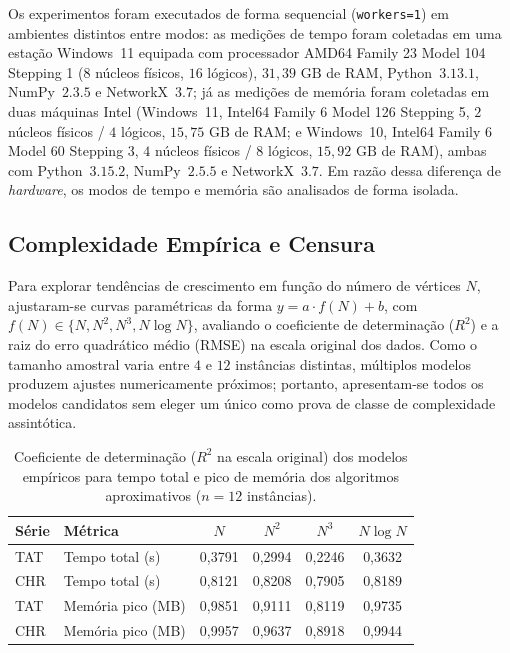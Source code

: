 \documentclass[12pt]{article}
\begin{document}
Os experimentos foram executados de forma sequencial (\texttt{workers=1}) em ambientes distintos entre modos: as medições de tempo foram coletadas em uma estação Windows~11 equipada com processador AMD64 Family 23 Model 104 Stepping 1 ($8$ núcleos físicos, $16$ lógicos), $31{,}39\text{ GB}$ de RAM, Python~$3.13.1$, NumPy~$2.3.5$ e NetworkX~$3.7$; já as medições de memória foram coletadas em duas máquinas Intel (Windows~11, Intel64 Family 6 Model 126 Stepping 5, $2$ núcleos físicos / $4$ lógicos, $15{,}75\text{ GB}$ de RAM; e Windows~10, Intel64 Family 6 Model 60 Stepping 3, $4$ núcleos físicos / $8$ lógicos, $15{,}92\text{ GB}$ de RAM), ambas com Python~$3.15.2$, NumPy~$2.5.5$ e NetworkX~$3.7$. Em razão dessa diferença de \textit{hardware}, os modos de tempo e memória são analisados de forma isolada.


\subsection{Complexidade Empírica e Censura}

Para explorar tendências de crescimento em função do número de vértices $N$, ajustaram-se curvas paramétricas da forma $y = a \cdot f(N) + b$, com $f(N) \in \{N, N^2, N^3, N \log N\}$, avaliando o coeficiente de determinação ($R^2$) e a raiz do erro quadrático médio (RMSE) na escala original dos dados. Como o tamanho amostral varia entre $4$ e $12$ instâncias distintas, múltiplos modelos produzem ajustes numericamente próximos; portanto, apresentam-se todos os modelos candidatos sem eleger um único como prova de classe de complexidade assintótica.

\begin{table}[ht]
\centering
\caption{Coeficiente de determinação ($R^2$ na escala original) dos modelos empíricos para tempo total e pico de memória dos algoritmos aproximativos ($n = 12$ instâncias).}
\label{tab:regressao_aprox}
\small
\begin{tabular}{llcccc}
\toprule
\textbf{Série} & \textbf{Métrica} & \textbf{$N$} & \textbf{$N^2$} & \textbf{$N^3$} & \textbf{$N \log N$} \\
\midrule
TAT & Tempo total (s)   & 0,3791 & 0,2994 & 0,2246 & 0,3632 \\
CHR & Tempo total (s)   & 0,8121 & 0,8208 & 0,7905 & 0,8189 \\
\midrule
TAT & Memória pico (MB) & 0,9851 & 0,9111 & 0,8119 & 0,9735 \\
CHR & Memória pico (MB) & 0,9957 & 0,9637 & 0,8918 & 0,9944 \\
\bottomrule
\end{tabular}
\end{table}
\end{document}
